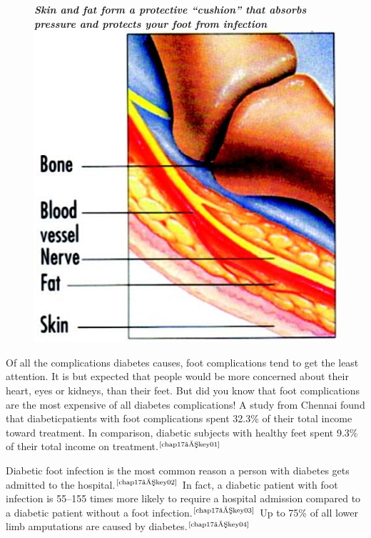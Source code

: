 \begin{figure}
\centering
{\small\textbf{\textit{Skin and fat form a protective “cushion” that absorbs pressure and protects your foot from infection}}}\\
\includegraphics[scale=.8]{images/056.jpg}
\end{figure}

Of all the complications diabetes causes, foot complications tend to get the least attention. It is but expected that people would be more concerned about their heart, eyes or kidneys, than their feet. But did you know that foot complications are the most expensive of all diabetes complications! A study from Chennai found that diabetic\break patients with foot complications spent 32.3\% of their total income toward treatment. In comparison, diabetic subjects with healthy feet spent 9.3\% of their total income on treatment.$^{\text{\cite{chap17–key01}}}$

Diabetic foot infection is the most common reason a person with diabetes gets admitted to the hospital.$^{\text{\cite{chap17–key02}}}$ In fact, a diabetic patient with foot infection is 55–155 times more likely to require a hospital admi\-ssion compared to a diabetic patient without a foot infection.$^{\text{\cite{chap17–key03}}}$ Up to 75\% of all lower limb amputations are caused by diabetes.$^{\text{\cite{chap17–key04}}}$

